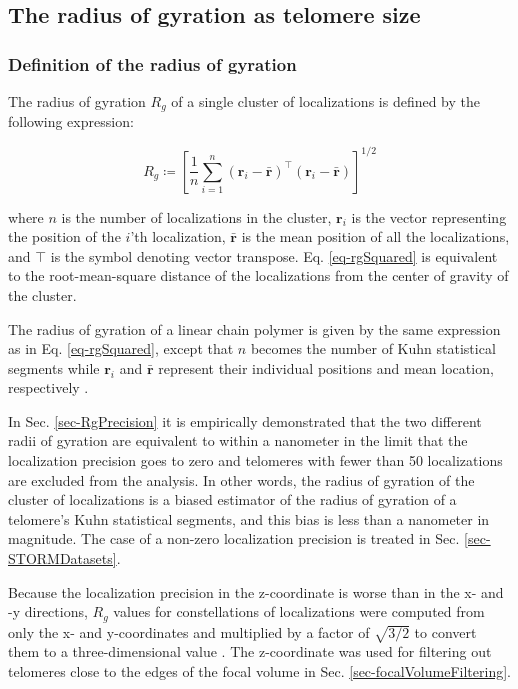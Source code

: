 \documentclass[12pt, a4paper]{article}
\begin{document}
\subsection{The radius of gyration as telomere size}
\label{sec-1-3}

\subsubsection{Definition of the radius of gyration}
\label{sec-1-3-1}
The radius of gyration $R_g$ of a single cluster of localizations
is defined by the following expression:

\begin{equation}
\label{eq-rgSquared}
R_g \coloneqq \left[ \frac{1}{n} \sum_{i = 1}^{n} \left( \mathbf{r}_i - \bar{\mathbf{r}} \right)^{\intercal} \left( \mathbf{r}_i - \bar{\mathbf{r}} \right) \right]^{1/2}
\end{equation}

where $n$ is the number of localizations in the cluster,
$\mathbf{r}_i$ is the vector representing the position of the
$i$'th localization, $\bar{\mathbf{r}}$ is the mean position of
all the localizations, and $\intercal$ is the symbol denoting
vector transpose. Eq. \eqref{eq-rgSquared} is equivalent to the
root-mean-square distance of the localizations from the center of
gravity of the cluster.

The radius of gyration of a linear chain polymer is given by the
same expression as in Eq. \eqref{eq-rgSquared}, except that $n$
becomes the number of Kuhn statistical segments while
$\mathbf{r}_i$ and $\bar{\mathbf{r}}$ represent their individual
positions and mean location, respectively
\cite{flory-statmechchainmolecules-1989}.

In Sec. \ref{sec-RgPrecision} it is empirically demonstrated that
the two different radii of gyration are equivalent to within a
nanometer in the limit that the localization precision goes to
zero and telomeres with fewer than 50 localizations are excluded
from the analysis. In other words, the radius of gyration of the
cluster of localizations is a biased estimator of the radius of
gyration of a telomere's Kuhn statistical segments, and this bias
is less than a nanometer in magnitude. The case of a non-zero
localization precision is treated in Sec. \ref{sec-STORMDatasets}.

Because the localization precision in the z-coordinate is worse
than in the x- and -y directions, $R_g$ values for constellations
of localizations were computed from only the x- and y-coordinates
and multiplied by a factor of $\sqrt{3/2}$ to convert them to a
three-dimensional value \cite{rivetti-jmolbiol-1996}. The
z-coordinate was used for filtering out telomeres close to the
edges of the focal volume in Sec. \ref{sec-focalVolumeFiltering}.
\end{document}

